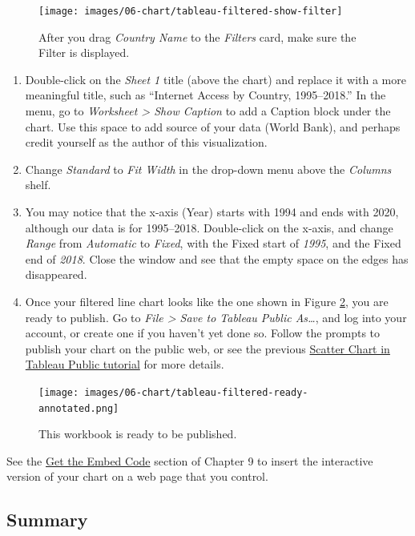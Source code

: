 \documentclass[
  english,
]{book}
\begin{document}
\begin{figure}
\texttt{[image: images/06-chart/tableau-filtered-show-filter]} \caption{After you drag \emph{Country Name} to the \emph{Filters} card, make sure the Filter is displayed.}\label{fig:tableau-filtered-show-filter}
\end{figure}

\begin{enumerate}
\def\labelenumi{\arabic{enumi}.}
\setcounter{enumi}{6}
\item
  Double-click on the \emph{Sheet 1} title (above the chart) and replace it with a more meaningful title, such as ``Internet Access by Country, 1995--2018.'' In the menu, go to \emph{Worksheet \textgreater{} Show Caption} to add a Caption block under the chart. Use this space to add source of your data (World Bank), and perhaps credit yourself as
  the author of this visualization.
\item
  Change \emph{Standard} to \emph{Fit Width} in the drop-down menu above the \emph{Columns} shelf.
\item
  You may notice that the x-axis (Year) starts with 1994 and ends with 2020,
  although our data is for 1995--2018. Double-click on the x-axis, and change
  \emph{Range} from \emph{Automatic} to \emph{Fixed}, with the Fixed start of \emph{1995}, and the Fixed end of \emph{2018}.
  Close the window and see that the empty space on the edges has disappeared.
\item
  Once your filtered line chart looks like the one shown in Figure \ref{fig:tableau-filtered-ready},
  you are ready to publish. Go to \emph{File \textgreater{} Save to Tableau Public As\ldots{}}, and log into your account, or create one if you haven't yet done so. Follow the prompts to publish your chart on the public web, or see the previous \href{scatter-tableau.html}{Scatter Chart in Tableau Public tutorial} for more details.
\end{enumerate}



\begin{figure}
\centering
\texttt{[image: images/06-chart/tableau-filtered-ready-annotated.png]}
\caption{\label{fig:tableau-filtered-ready}This workbook is ready to be published.}
\end{figure}

See the \href{embed-code.html}{Get the Embed Code} section of Chapter 9 to insert the interactive version of your chart on a web page that you control.

\hypertarget{summary6}{%
\subsection*{Summary}\label{summary6}}
\end{document}
